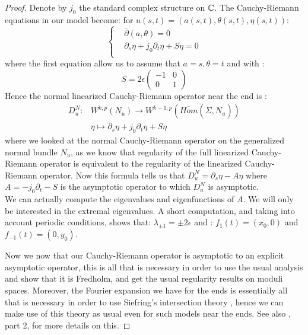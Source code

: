 \documentclass[../main.tex]{subfiles}
\begin{document}
\begin{proof}
Denote by $j_0$ the standard complex structure on $\C$. The Cauchy-Riemann equations in our model become: for $u(s,t) = (a(s,t),\theta(s,t),\eta(s,t))$: 
\begin{equation*}
\left\{
\begin{array}{lll}
    &\overline{\partial}(a,\theta) = 0 \\
    & \partial_s\eta + j_0\partial_t\eta + S\eta = 0 \\
\end{array}
\right.
\end{equation*}
where the first equation allow us to assume that $a = s,\theta = t$ and with :
$$S = 2\epsilon\begin{pmatrix}
    -1&0\\
    0&1
\end{pmatrix}$$
Hence the normal linearized Cauchy-Riemann operator near the end is : 
$$
\begin{array}{ll}
D_u^N : &W^{k,p}(N_u) \rightarrow W^{k-1,p}(\overline{Hom}(\dot \Sigma,N_u))\\
&\eta \mapsto \partial_s\eta + j_0\partial_t\eta + S\eta

\end{array}
$$
where we looked at the normal Cauchy-Riemann operator on the generalized normal bundle $N_u$, as we know that regularity of the full linearized Cauchy-Riemann operator is equivalent to the regularity of the linearized Cauchy-Riemann operator. Now this formula tells us that $D_u^N = \partial_s\eta - A\eta$ where $A = -j_0\partial_t - S$ is the asymptotic operator to which $D_u^N$ is asymptotic. \\
We can actually compute the eigenvalues and eigenfunctions of $A$. We will only be interested in the extremal eigenvalues. A short computation, and taking into account periodic conditions, shows that: $\lambda_{\pm1} = \pm2\epsilon$ and : $f_{1}(t) = (x_0,0)$ and $f_{-1}(t) = (0,y_0)$.

Now we now that our Cauchy-Riemann operator is asymptotic to an explicit asymptotic operator, this is all that is necessary in order to use the usual analysis and show that it is Fredholm, and get the usual regularity results on moduli spaces. Moreover, the Fourier expansion we have for the ends is essentially all that is necessary in order to use Siefring's intersection theory \cite{siefring_intersection_2011}, hence we can make use of this theory as usual even for such models near the ends. See also \cite{zhou_unknottedness_2025}, part 2, for more details on this.
\end{proof}
\end{document}
